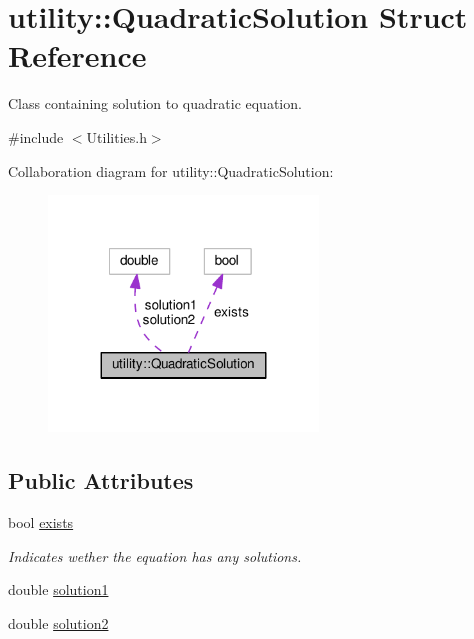 \hypertarget{structutility_1_1QuadraticSolution}{}\section{utility\+:\+:Quadratic\+Solution Struct Reference}
\label{structutility_1_1QuadraticSolution}


Class containing solution to quadratic equation.  




{\ttfamily \#include $<$Utilities.\+h$>$}



Collaboration diagram for utility\+:\+:Quadratic\+Solution\+:\nopagebreak
\begin{figure}[H]
\begin{center}
\leavevmode
\includegraphics[width=203pt]{structutility_1_1QuadraticSolution__coll__graph}
\end{center}
\end{figure}
\subsection*{Public Attributes}
\begin{DoxyCompactItemize}
\item 
bool \hyperlink{structutility_1_1QuadraticSolution_a76dd00a33b769e90b158877ffc0dc7ee}{exists}
\begin{DoxyCompactList}\small\item\em Indicates wether the equation has any solutions. \end{DoxyCompactList}\item 
double \hyperlink{structutility_1_1QuadraticSolution_ad5483ce614475c079a24d3fda275b98e}{solution1}
\item 
double \hyperlink{structutility_1_1QuadraticSolution_a0841bdbfa4b63ae9e4d0ae95e258f319}{solution2}
\end{DoxyCompactItemize}


